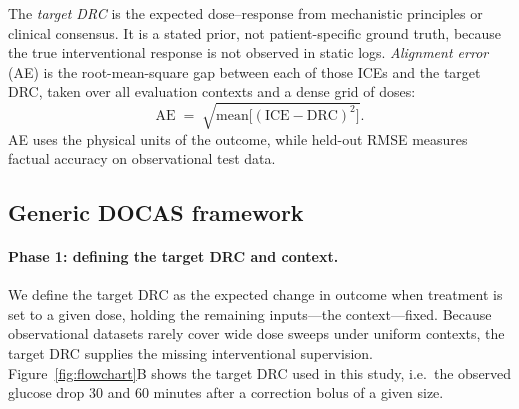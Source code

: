 \documentclass[a4paper,fleqn]{cas-sc}
\begin{document}
The \emph{target DRC} is the expected dose--response from
mechanistic principles or clinical consensus. It is a stated prior, not
patient-specific ground truth, because the true interventional response is not
observed in static logs. \emph{Alignment error} (AE) is the root-mean-square
gap between each of those ICEs and the target DRC, taken over all evaluation
contexts and a dense grid of doses:
\begin{equation}
  \mathrm{AE}
  \;=\;
  \sqrt{\mathrm{mean}\bigl[(\text{ICE}-\text{DRC})^{2}\bigr]}.
  \label{eq:alignment-error}
\end{equation}
AE uses the physical units of the outcome, while held-out RMSE measures factual
accuracy on observational test data.

\subsection{Generic DOCAS framework}
\label{subsec:docas-generic}

\paragraph{Phase 1: defining the target DRC and context.}
We define the target DRC as the expected change in outcome when treatment is
set to a given dose, holding the remaining inputs---the context---fixed.
Because observational datasets rarely cover wide dose sweeps
under uniform contexts, the target DRC supplies the missing interventional
supervision. Figure~\ref{fig:flowchart}B shows the target DRC used in this study, i.e.\ the
observed glucose drop 30 and 60 minutes after a correction bolus of a given size.
\end{document}
